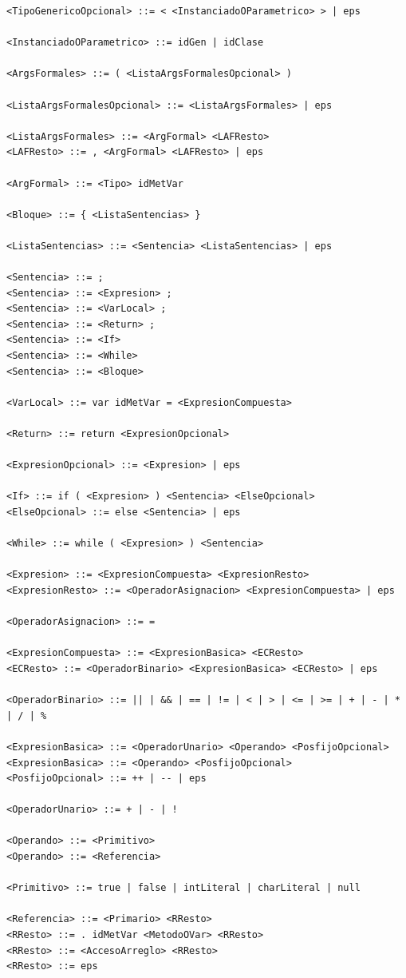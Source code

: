 \documentclass[11pt,a4paper]{article}
\begin{document}
{\begin{verbatim}
<TipoGenericoOpcional> ::= < <InstanciadoOParametrico> > | eps

<InstanciadoOParametrico> ::= idGen | idClase

<ArgsFormales> ::= ( <ListaArgsFormalesOpcional> )

<ListaArgsFormalesOpcional> ::= <ListaArgsFormales> | eps

<ListaArgsFormales> ::= <ArgFormal> <LAFResto>
<LAFResto> ::= , <ArgFormal> <LAFResto> | eps

<ArgFormal> ::= <Tipo> idMetVar

<Bloque> ::= { <ListaSentencias> }

<ListaSentencias> ::= <Sentencia> <ListaSentencias> | eps

<Sentencia> ::= ;
<Sentencia> ::= <Expresion> ;
<Sentencia> ::= <VarLocal> ;
<Sentencia> ::= <Return> ;
<Sentencia> ::= <If>
<Sentencia> ::= <While>
<Sentencia> ::= <Bloque>

<VarLocal> ::= var idMetVar = <ExpresionCompuesta>

<Return> ::= return <ExpresionOpcional>

<ExpresionOpcional> ::= <Expresion> | eps

<If> ::= if ( <Expresion> ) <Sentencia> <ElseOpcional>
<ElseOpcional> ::= else <Sentencia> | eps

<While> ::= while ( <Expresion> ) <Sentencia>

<Expresion> ::= <ExpresionCompuesta> <ExpresionResto>
<ExpresionResto> ::= <OperadorAsignacion> <ExpresionCompuesta> | eps

<OperadorAsignacion> ::= =

<ExpresionCompuesta> ::= <ExpresionBasica> <ECResto>
<ECResto> ::= <OperadorBinario> <ExpresionBasica> <ECResto> | eps

<OperadorBinario> ::= || | && | == | != | < | > | <= | >= | + | - | * | / | %

<ExpresionBasica> ::= <OperadorUnario> <Operando> <PosfijoOpcional>
<ExpresionBasica> ::= <Operando> <PosfijoOpcional>
<PosfijoOpcional> ::= ++ | -- | eps

<OperadorUnario> ::= + | - | !

<Operando> ::= <Primitivo>
<Operando> ::= <Referencia>

<Primitivo> ::= true | false | intLiteral | charLiteral | null

<Referencia> ::= <Primario> <RResto>
<RResto> ::= . idMetVar <MetodoOVar> <RResto>
<RResto> ::= <AccesoArreglo> <RResto>
<RResto> ::= eps


\end{verbatim}}
\end{document}

